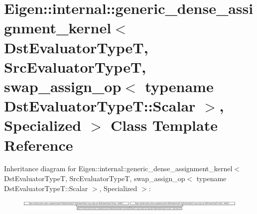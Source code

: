 \hypertarget{class_eigen_1_1internal_1_1generic__dense__assignment__kernel_3_01_dst_evaluator_type_t_00_01_sr759181e846694beea0b332c7e3bbe519}{}\section{Eigen\+:\+:internal\+:\+:generic\+\_\+dense\+\_\+assignment\+\_\+kernel$<$ Dst\+Evaluator\+TypeT, Src\+Evaluator\+TypeT, swap\+\_\+assign\+\_\+op$<$ typename Dst\+Evaluator\+TypeT\+:\+:Scalar $>$, Specialized $>$ Class Template Reference}
\label{class_eigen_1_1internal_1_1generic__dense__assignment__kernel_3_01_dst_evaluator_type_t_00_01_sr759181e846694beea0b332c7e3bbe519}
Inheritance diagram for Eigen\+:\+:internal\+:\+:generic\+\_\+dense\+\_\+assignment\+\_\+kernel$<$ Dst\+Evaluator\+TypeT, Src\+Evaluator\+TypeT, swap\+\_\+assign\+\_\+op$<$ typename Dst\+Evaluator\+TypeT\+:\+:Scalar $>$, Specialized $>$\+:\begin{figure}[H]
\begin{center}
\leavevmode
\includegraphics[height=0.583942cm]{class_eigen_1_1internal_1_1generic__dense__assignment__kernel_3_01_dst_evaluator_type_t_00_01_sr759181e846694beea0b332c7e3bbe519}
\end{center}
\end{figure}
